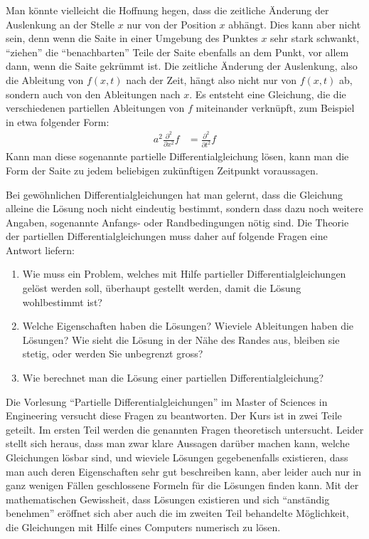 Man könnte vielleicht die Hoffnung hegen, dass die zeitliche Änderung
der Auslenkung an der Stelle $x$ nur von der Position $x$ abhängt.
Dies kann aber nicht sein, denn wenn die Saite in einer Umgebung
des Punktes $x$ sehr stark schwankt, ``ziehen'' die ``benachbarten'' Teile
der Saite ebenfalls an dem Punkt, vor allem dann, wenn die Saite gekrümmt
ist. Die zeitliche Änderung der Auslenkung, also die Ableitung von $f(x,t)$
nach der Zeit, hängt also nicht nur von $f(x,t)$ ab, sondern auch von
den Ableitungen nach $x$. Es entsteht eine Gleichung, die die verschiedenen
partiellen Ableitungen von $f$ miteinander verknüpft, zum Beispiel in
etwa folgender Form:
\begin{align*}
a^2\frac{\partial^2}{\partial x^2}f&= \frac{\partial^2}{\partial t^2}f
\end{align*}
Kann man diese sogenannte partielle Differentialgleichung lösen,
kann man die Form der Saite zu jedem
beliebigen zukünftigen Zeitpunkt voraussagen.

Bei gewöhnlichen Differentialgleichungen hat man gelernt, dass die Gleichung
alleine die Lösung noch nicht eindeutig bestimmt, sondern dass dazu noch
weitere Angaben, sogenannte Anfangs- oder Randbedingungen nötig sind.
Die Theorie der partiellen Differentialgleichungen muss daher auf folgende
Fragen eine Antwort liefern:
\begin{enumerate}
\item Wie muss ein Problem, welches mit Hilfe partieller Differentialgleichungen
gelöst werden soll, überhaupt gestellt werden, damit die Lösung wohlbestimmt
ist?
\item Welche Eigenschaften haben die Lösungen? Wieviele Ableitungen haben
die Lösungen? Wie sieht die Lösung in der Nähe des Randes aus, bleiben
sie stetig, oder werden Sie unbegrenzt gross?
\item Wie berechnet man die Lösung einer partiellen Differentialgleichung?
\end{enumerate}
Die Vorlesung ``Partielle Differentialgleichungen'' im Master of Sciences in
Engineering versucht diese Fragen zu beantworten. Der Kurs ist in zwei Teile
geteilt. Im ersten Teil werden die genannten Fragen theoretisch untersucht.
Leider stellt sich heraus, dass man zwar klare Aussagen darüber machen kann,
welche Gleichungen lösbar sind, und wieviele Lösungen gegebenenfalls
existieren, dass man auch deren Eigenschaften sehr gut beschreiben kann,
aber leider auch nur in ganz wenigen Fällen geschlossene Formeln für die
Lösungen finden kann. Mit der mathematischen Gewissheit, dass Lösungen
existieren und sich ``anständig benehmen'' eröffnet sich aber auch die
im zweiten Teil behandelte Möglichkeit, die Gleichungen mit Hilfe eines
Computers numerisch zu lösen.

